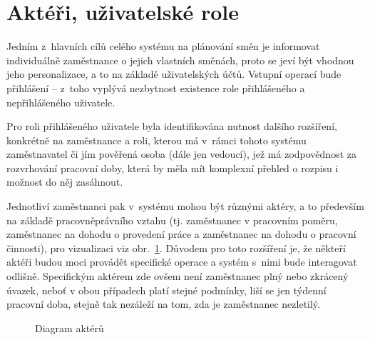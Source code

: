 \documentclass[twoside]{ctuthesis}
\begin{document}
\section{Aktéři, uživatelské role}
Jedním z~hlavních cílů celého systému na plánování směn je informovat individuálně zaměstnance o jejich vlastních směnách, proto se jeví být vhodnou jeho personalizace, a to na základě uživatelských účtů. Vstupní operací bude přihlášení -- z~toho vyplývá nezbytnost existence role přihlášeného a nepřihlášeného uživatele.

Pro roli přihlášeného uživatele byla identifikována nutnost dalšího rozšíření, konkrétně na zaměstnance a roli, kterou má v~rámci tohoto systému za\-měst\-na\-va\-tel či jím pověřená osoba (dále jen vedoucí), jež má zodpovědnost za rozvrhování pracovní doby, která by měla mít komplexní přehled o rozpisu i možnost do něj zasáhnout.

Jednotliví zaměstnanci pak v~systému mohou být různými aktéry, a to především na základě pracovněprávního vztahu (tj. zaměstnanec v pracovním poměru, zaměstnanec na dohodu o provedení práce a zaměstnanec na dohodu o pracovní činnosti), pro vizualizaci viz obr.~\ref{fig:userroles}. Důvodem pro toto rozšíření je, že někteří aktéři budou moci provádět specifické operace a systém s~nimi bude interagovat odlišně. Specifickým aktérem zde ovšem není zaměstnanec plný nebo zkrácený úvazek, neboť v obou případech platí stejné podmínky, liší se jen týdenní pracovní doba, stejně tak nezáleží na tom, zda je zaměstnanec nezletilý.

\begin{figure}[h]
	
	\caption{Diagram aktérů}
	\label{fig:userroles}
\end{figure}
\end{document}
